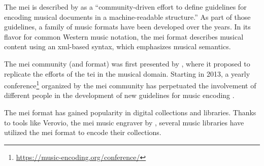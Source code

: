 

The \gls{mei} is described by \textcite{hankinson2011music}
as a ``community-driven effort to define guidelines for
encoding musical documents in a machine-readable
structure.'' As part of those guidelines, a family of music
formats have been developed over the years. In its flavor
for common Western music notation, the \gls{mei} format
describes musical content using an \gls{xml}-based syntax,
which emphasizes musical semantics.


The \gls{mei} community (and format) was first presented by
\textcite{roland2002music}, where it proposed to replicate
the efforts of the \gls{tei} in the musical domain. Starting
in 2013, a yearly
conference\footnote{\href{https://music-encoding.org/conference/}{https://music-encoding.org/conference/}}
organized by the \gls{mei} community has perpetuated the
involvement of different people in the development of new
guidelines for music encoding
\parencite{crawford2016review}.


The \gls{mei} format has gained popularity in digital
collections and libraries. Thanks to tools like Verovio, the
\gls{mei} music engraver by \textcite{pugin2014verovio},
several music libraries have utilized the \gls{mei} format
to encode their collections.

